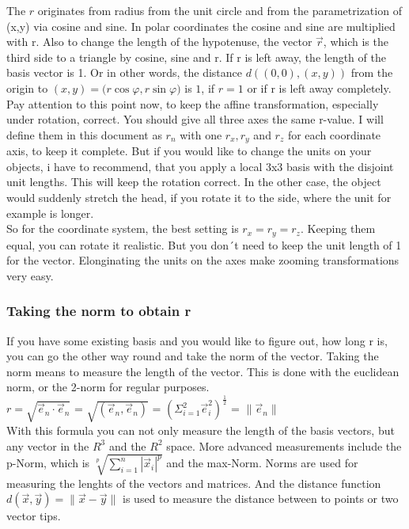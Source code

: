 \documentclass[a4paper]{article}
\begin{document}
The $r$ originates from radius from the unit circle and from the parametrization of (x,y) via cosine and sine. 
In polar coordinates the cosine and sine are multiplied with r. Also to change the length of the hypotenuse, 
the vector $\vec{r}$, which is the third side to a triangle by cosine, sine and r. 
If r is left away, the length of the basis vector is 1. Or in other words, the distance $d((0,0),(x,y))$ from the origin to $(x,y)=($$r \cos \varphi$$, $$r \sin \varphi$$)$ is $1$, if $r=1$ or if r is left away completely.\\

Pay attention to this point now, to keep the affine transformation, especially under rotation, correct. You should give all three
axes the same r-value. I will define them in this document as $r_n$ with one $r_x, r_y$ and $r_z$ for each coordinate axis,
to keep it complete. But if you would like to change the units on your objects, i have to recommend, that you apply a local
3x3 basis with the disjoint unit lengths. This will keep the rotation correct. In the other case, the object would suddenly
stretch the head, if you rotate it to the side, where the unit for example is longer.\\

So for the coordinate system, the best setting is $r_x = r_y = r_z$. Keeping them equal, you can rotate it realistic. But you
don´t need to keep the unit length of 1 for the vector. Elonginating the units on the axes make zooming transformations very
easy.\\

\subsubsection{Taking the norm to obtain r}

If you have some existing basis and you would like to figure out, how long r is, you can go the other way round and take the
norm of the vector. Taking the norm means to measure the length of the vector. This is done with the euclidean norm, or the
2-norm for regular purposes.\\

$r = \sqrt{\vec{e}_n\cdot\vec{e}_n}$ = $\sqrt{(\vec{e}_n,\vec{e}_n)}$ = $\left(\Sigma_{i=1}^{2} \vec{e}_i^2\right)^{\frac{1}{2}}$ = $\|\vec{e}_n\|$\\

With this formula you can not only measure the length of the basis vectors, but any vector in the $R^{3}$ and the $R^{2}$ space. 
More advanced measurements include the p-Norm, which is $\sqrt[p]{\sum_{i=1}^{n}|\vec{x}_i|^{p}}$ and the max-Norm. Norms are used
for measuring the lenghts of the vectors and matrices. And the distance function $d(\vec{x},\vec{y}) = \|\vec{x}-\vec{y}\|$ is used
to measure the distance between to points or two vector tips.\\
\end{document}
